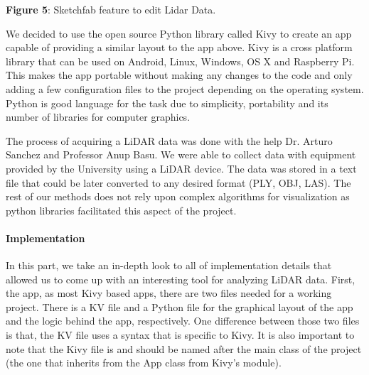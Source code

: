 \documentclass[12pt]{report}
\begin{document}
\begin{Center}
\textbf{Figure 5}: Sketchfab feature to edit Lidar Data.
\end{Center}\par


\vspace{\baselineskip}
\begin{FlushLeft}
We decided to use the open source Python library called Kivy to create an app capable of providing a similar layout to the app above. Kivy is a cross platform library that can be used on Android, Linux, Windows, OS X and Raspberry Pi. This makes the app portable without making any changes to the code and only adding a few configuration files to the project depending on the operating system. Python is good language for the task due to simplicity, portability and its number of libraries for computer graphics. 
\end{FlushLeft}\par

\begin{FlushLeft}
The process of acquiring a LiDAR data was done with the help Dr. Arturo Sanchez and Professor Anup Basu. We were able to collect data with equipment provided by the University using a LiDAR device. The data was stored in a text file that could be later converted to any desired format (PLY, OBJ, LAS). The rest of our methods does not rely upon complex algorithms for visualization as python libraries facilitated this aspect of the project.
\end{FlushLeft}\par

\paragraph*{Implementation}

\vspace{\baselineskip}
\tab In this part, we take an in-depth look to all of implementation details that allowed us to come up with an interesting tool for analyzing LiDAR data. First, the app, as most Kivy based apps, there are two files needed for a working project. There is a KV file and a Python file for the graphical layout of the app and the logic behind the app, respectively. One difference between those two files is that, the KV file uses a syntax that is specific to Kivy. It is also important to note that the Kivy file is and should be named after the main class of the project (the one that inherits from the App class from Kivy’s module). \par
\end{document}
